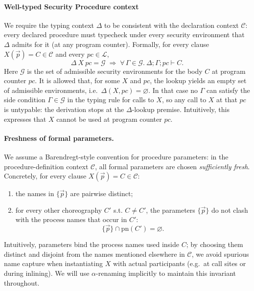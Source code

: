 \documentclass[12pt,a4paper,twoside]{book}
\newcommand{\pn}{\mathrm{pn}}
\begin{document}
\paragraph{Well-typed Security Procedure context}
We require the typing context \(\Delta\) to be consistent with the declaration context \(\mathscr{C}\): every declared procedure must typecheck under every security environment that \(\Delta\) admits for it (at any program counter). Formally, for every clause \(X(\vec{p}) = C \in \mathscr{C}\) and every \(pc \in \mathscr{L}\),
\[
  \Delta~X~pc = \mathcal{G}
  \;\Longrightarrow\;
  \forall\,\Gamma \in \mathcal{G}.\ \Delta;\Gamma;pc \vdash C.
\]
Here \(\mathcal{G}\) is the set of admissible security environments for the body \(C\) at program counter \(pc\).
It is allowed that, for some \(X\) and \(pc\), the lookup yields an empty set of admissible environments, i.e.\ \(\Delta(X,pc)=\varnothing\).
In that case no \(\Gamma\) can satisfy the side condition \(\Gamma \in \mathcal{G}\) in the typing rule for calls to \(X\), so any call to \(X\) at that \(pc\) is untypable: the derivation stops at the \(\Delta\)-lookup premise. Intuitively, this expresses that \(X\) cannot be used at program counter \(pc\).

\paragraph{Freshness of formal parameters.}
We assume a Barendregt-style convention for procedure parameters\cite{barendregt1984lambda}: in the procedure-definition context \(\mathscr{C}\), all formal parameters are chosen \emph{sufficiently fresh}. Concretely, for every clause \(X(\vec{p}) = C \in \mathscr{C}\):
\begin{enumerate}
  \item the names in \(\{\vec{p}\}\) are pairwise distinct;
  \item for every other choreography $C'$ s.t. \(C \neq C'\), the parameters \(\{\vec{p}\}\) do not clash with the process names that occur in \(C'\):
  \[
    \{\vec{p}\} \cap \pn(C') = \varnothing.
  \]
\end{enumerate}
Intuitively, parameters bind the process names used inside \(C\); by choosing them distinct and disjoint from the names mentioned elsewhere in \(\mathscr{C}\), we avoid spurious name capture when instantiating \(X\) with actual participants (e.g.\ at call sites or during inlining). We will use \(\alpha\)-renaming implicitly to maintain this invariant throughout.
\end{document}
